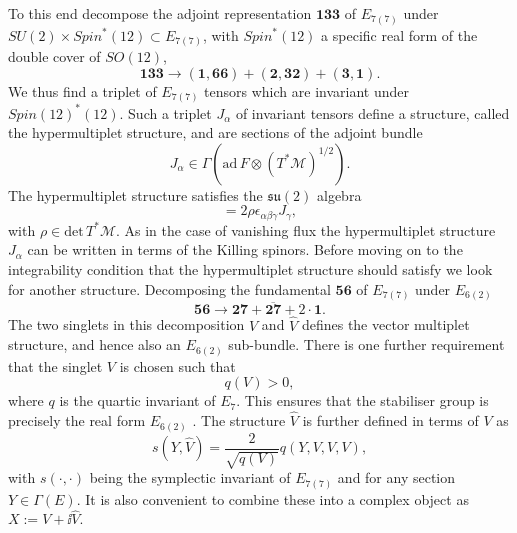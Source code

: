 To this end decompose the adjoint representation $\mathbf{133}$ of $E_{7(7)}$ under $SU(2)\times Spin^*(12)\subset E_{7(7)}$, with $Spin^*(12)$ a specific real form of the double cover of $SO(12)$,
\begin{equation}
    \mathbf{133}\to (\mathbf{1},\mathbf{66})+(\mathbf{2},\mathbf{32})+(\mathbf{3},\mathbf{1}).
\end{equation}
We thus find a triplet of $E_{7(7)}$ tensors which are invariant under $Spin(12)^*(12)$. Such a triplet $J_\alpha$ of invariant tensors define a structure, called the hypermultiplet structure, and are sections of the adjoint bundle 
\begin{equation}
    J_\alpha \in \Gamma(\text{ad}\, F\otimes \left(T^*\mathcal{M}\right)^{1/2}).
\end{equation}
The hypermultiplet structure satisfies the $\mathfrak{su}(2)$ algebra 
\begin{equation}
    [J_\alpha,J_\beta] =2\rho \epsilon_{\alpha\beta\gamma}J_\gamma,
\end{equation}
with $\rho\in\text{det}\,T^*\mathcal{M}$. As in the case of vanishing flux the hypermultiplet structure $J_\alpha$ can be written in terms of the Killing spinors. Before moving on to the integrability condition that the hypermultiplet structure should satisfy we look for another structure. Decomposing the fundamental $\mathbf{56}$ of $E_{7(7)}$ under $E_{6(2)}$
\begin{equation}
    \mathbf{56}\to\mathbf{27}+\overbar{\mathbf{27}}+2\cdot \mathbf{1}.
\end{equation}
The two singlets in this decomposition $V$ and $\hat{V}$ defines the vector multiplet structure, and hence also an $E_{6(2)}$ sub-bundle. There is one further requirement that the singlet $V$ is chosen such that 
\begin{equation}
    q(V)>0,
\end{equation}
where $q$ is the quartic invariant of $E_7$. This ensures that the stabiliser group is precisely the real form $E_{6(2)}$ \cite{Ferrara:1997uz}. The structure $\hat{V}$ is further defined in terms of $V$ as 
\begin{equation}
    s(Y,\hat{V}) = \frac{2}{\sqrt{q(V)}}q(Y,V,V,V),
\end{equation}
with $s(\cdot,\cdot)$ being the symplectic invariant of $E_{7(7)}$ and for any section $Y\in\Gamma(E)$. It is also convenient to combine these into a complex object as $X:= V+\ii\hat{V}$. 

